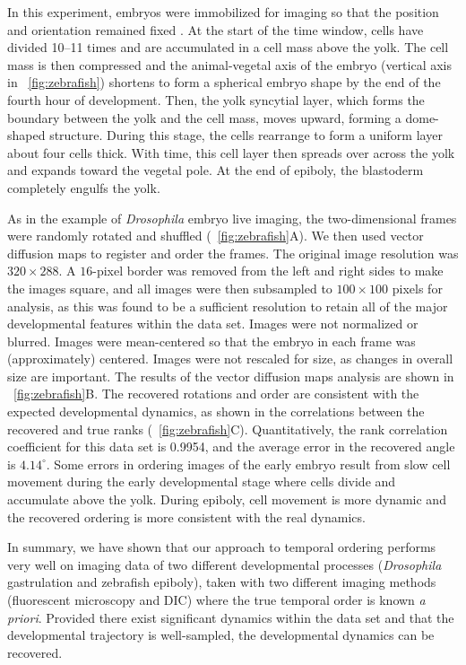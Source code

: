 In this experiment, embryos were immobilized for imaging so that the position and orientation remained fixed \citep{kane1996zebrafish}.
%
At the start of the time window, cells have divided 10--11 times and are accumulated in a cell mass above the yolk.
%
The cell mass is then compressed and the animal-vegetal axis of the embryo (vertical axis in \fig~\ref{fig:zebrafish}) shortens to form a spherical embryo shape by the end of the fourth hour of development.
%
Then, the yolk syncytial layer, which forms the boundary between the yolk and the cell mass, moves upward, forming a dome-shaped structure.
%
During this stage, the cells rearrange to form a uniform layer about four cells thick.
%
With time, this cell layer then spreads over across the yolk and expands toward the vegetal pole.
%
At the end of epiboly, the blastoderm completely engulfs the yolk.

As in the example of {\em Drosophila} embryo live imaging, the two-dimensional frames were randomly rotated and shuffled (\fig~\ref{fig:zebrafish}A).
%
We then used vector diffusion maps to register and order the frames.
%
The original image resolution was $320 \times 288$.
%
A $16$-pixel border was removed from the left and right sides to make the images square, and all images were then subsampled to $100 \times 100$ pixels for analysis, as this was found to be a sufficient resolution to retain all of the major developmental features within the data set.
%
Images were not normalized or blurred.
%
Images were mean-centered so that the embryo in each frame was (approximately) centered.
%
Images were not rescaled for size, as changes in overall size are important.
%
The results of the vector diffusion maps analysis are shown in \fig~\ref{fig:zebrafish}B.
%
The recovered rotations and order are consistent with the expected developmental dynamics, as shown in the correlations between the recovered and true ranks (\fig~\ref{fig:zebrafish}C).
%
Quantitatively, the rank correlation coefficient for this data set is 0.9954, and the average error in the recovered angle is $4.14^\circ$.
%
Some errors in ordering images of the early embryo result from slow cell movement during the early developmental stage where cells divide and accumulate above the yolk.
%
During epiboly, cell movement is more dynamic and the recovered ordering is more consistent with the real dynamics.

In summary, we have shown that our approach to temporal ordering performs very well on imaging data of two different developmental processes ({\em Drosophila} gastrulation and zebrafish epiboly), taken with two different imaging methods (fluorescent microscopy and DIC) where the true temporal order is known {\em a priori}.
%
Provided there exist significant dynamics within the data set and that the developmental trajectory is well-sampled, the developmental dynamics can be recovered.

